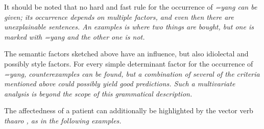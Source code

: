 It should be noted that no hard and fast rule for the occurrence of \em =yang \em can be given; its occurrence depends on multiple factors, and even then there are unexplainable sentences. An examples is  where two things are bought, but one is marked with \em =yang \em and the other one is not.


The semantic factors sketched above have an influence, but also idiolectal and possibly style factors. For every simple determinant factor for the occurrence of \em =yang\em, counterexamples can be found, but a combination of several of the criteria mentioned above could possibly yield good predictions. Such a multivariate analysis is beyond the scope of this grammatical description.

%
%
%
%
%
%



The affectedness of a patient can additionally be highlighted by the vector verb \em thaaro \em {}, as in the following examples.


